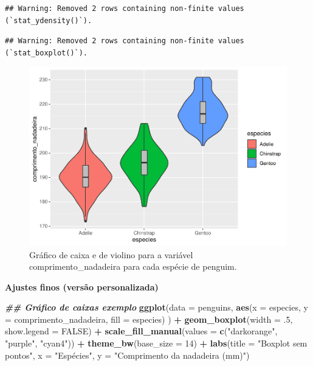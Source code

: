 \documentclass[
]{article}
\newenvironment{Shaded}{\begin{snugshade}}{\end{snugshade}}
\newcommand{\AttributeTok}[1]{\textcolor[rgb]{0.13,0.29,0.53}{#1}}
\newcommand{\ConstantTok}[1]{\textcolor[rgb]{0.56,0.35,0.01}{#1}}
\newcommand{\DecValTok}[1]{\textcolor[rgb]{0.00,0.00,0.81}{#1}}
\newcommand{\DocumentationTok}[1]{\textcolor[rgb]{0.56,0.35,0.01}{\textbf{\textit{#1}}}}
\newcommand{\FunctionTok}[1]{\textcolor[rgb]{0.13,0.29,0.53}{\textbf{#1}}}
\newcommand{\NormalTok}[1]{#1}
\newcommand{\SpecialCharTok}[1]{\textcolor[rgb]{0.81,0.36,0.00}{\textbf{#1}}}
\newcommand{\StringTok}[1]{\textcolor[rgb]{0.31,0.60,0.02}{#1}}
\begin{document}
\begin{verbatim}
## Warning: Removed 2 rows containing non-finite values (`stat_ydensity()`).
\end{verbatim}

\begin{verbatim}
## Warning: Removed 2 rows containing non-finite values (`stat_boxplot()`).
\end{verbatim}

\begin{figure}
\centering
\includegraphics{epr_files/figure-latex/fig-boxplot-violin-1.pdf}
\caption{\label{fig:fig-boxplot-violin}Gráfico de caixa e de violino para a variável comprimento\_nadadeira para cada espécie de penguim.}
\end{figure}

\textbf{Ajustes finos (versão personalizada)}

\begin{Shaded}
\begin{Highlighting}[]
\DocumentationTok{\#\# Gráfico de caixas exemplo}
\FunctionTok{ggplot}\NormalTok{(}\AttributeTok{data =}\NormalTok{ penguins, }
       \FunctionTok{aes}\NormalTok{(}\AttributeTok{x =}\NormalTok{ especies, }\AttributeTok{y =}\NormalTok{ comprimento\_nadadeira, }\AttributeTok{fill =}\NormalTok{ especies)}
\NormalTok{       ) }\SpecialCharTok{+}
    \FunctionTok{geom\_boxplot}\NormalTok{(}\AttributeTok{width =}\NormalTok{ .}\DecValTok{5}\NormalTok{, }\AttributeTok{show.legend =} \ConstantTok{FALSE}\NormalTok{) }\SpecialCharTok{+}
    \FunctionTok{scale\_fill\_manual}\NormalTok{(}\AttributeTok{values =} \FunctionTok{c}\NormalTok{(}\StringTok{"darkorange"}\NormalTok{, }\StringTok{"purple"}\NormalTok{, }\StringTok{"cyan4"}\NormalTok{)) }\SpecialCharTok{+}
    \FunctionTok{theme\_bw}\NormalTok{(}\AttributeTok{base\_size =} \DecValTok{14}\NormalTok{) }\SpecialCharTok{+}
    \FunctionTok{labs}\NormalTok{(}\AttributeTok{title =} \StringTok{"Boxplot sem pontos"}\NormalTok{, }\AttributeTok{x =} \StringTok{"Espécies"}\NormalTok{, }\AttributeTok{y =} \StringTok{"Comprimento da nadadeira (mm)"}\NormalTok{)}
\end{Highlighting}
\end{Shaded}
\end{document}
